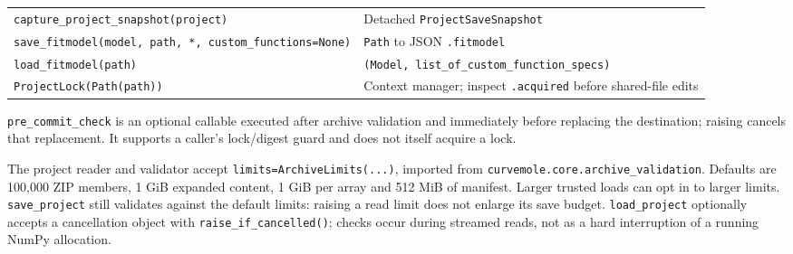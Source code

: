 \documentclass[
  10pt,
  a4paper,
  oneside]{scrreprt}
\begin{document}
\begin{longtable}[]{@{}ll@{}}
\begin{minipage}[t]{0.47\columnwidth}
\texttt{capture\_project\_snapshot(project)}\strut
\end{minipage} & \begin{minipage}[t]{0.47\columnwidth}\raggedright
Detached \texttt{ProjectSaveSnapshot}\strut
\end{minipage}\tabularnewline
\begin{minipage}[t]{0.47\columnwidth}\raggedright
\texttt{save\_fitmodel(model,\ path,\ *,\ custom\_functions=None)}\strut
\end{minipage} & \begin{minipage}[t]{0.47\columnwidth}\raggedright
\texttt{Path} to JSON \texttt{.fitmodel}\strut
\end{minipage}\tabularnewline
\begin{minipage}[t]{0.47\columnwidth}\raggedright
\texttt{load\_fitmodel(path)}\strut
\end{minipage} & \begin{minipage}[t]{0.47\columnwidth}\raggedright
\texttt{(Model,\ list\_of\_custom\_function\_specs)}\strut
\end{minipage}\tabularnewline
\begin{minipage}[t]{0.47\columnwidth}\raggedright
\texttt{ProjectLock(Path(path))}\strut
\end{minipage} & \begin{minipage}[t]{0.47\columnwidth}\raggedright
Context manager; inspect \texttt{.acquired} before shared-file
edits\strut
\end{minipage}\tabularnewline
\bottomrule
\end{longtable}

\texttt{pre\_commit\_check} is an optional callable executed after
archive validation and immediately before replacing the destination;
raising cancels that replacement. It supports a caller's lock/digest
guard and does not itself acquire a lock.

The project reader and validator accept
\texttt{limits=ArchiveLimits(...)}, imported from
\texttt{curvemole.core.archive\_validation}. Defaults are 100,000 ZIP
members, 1 GiB expanded content, 1 GiB per array and 512 MiB of
manifest. Larger trusted loads can opt in to larger limits.
\texttt{save\_project} still validates against the default limits:
raising a read limit does not enlarge its save budget.
\texttt{load\_project} optionally accepts a cancellation object with
\texttt{raise\_if\_cancelled()}; checks occur during streamed reads, not
as a hard interruption of a running NumPy allocation.
\end{document}
